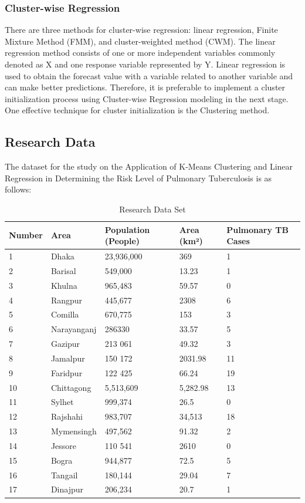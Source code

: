 \documentclass[conference]{IEEEtran}
\begin{document}
\subsubsection{Cluster-wise Regression}
There are three methods for cluster-wise regression: linear regression, Finite Mixture Method (FMM), and cluster-weighted method (CWM). The linear regression method consists of one or more independent variables commonly denoted as X and one response variable represented by Y. Linear regression is used to obtain the forecast value with a variable related to another variable and can make better predictions. Therefore, it is preferable to implement a cluster initialization process using Cluster-wise Regression modeling in the next stage. One effective technique for cluster initialization is the Clustering method.


\subsection{Research Data}
The dataset for the study on the Application of K-Means Clustering and Linear Regression in Determining the Risk Level of Pulmonary Tuberculosis is as follows:

\begin{table}[H]
    \centering
    \begin{tabularx}{\linewidth}{|X|X|X|X|X|}
    \hline
    \textbf{Number} & \textbf{Area} & \textbf{Population (People)} & \textbf{Area (km²)} & \textbf{Pulmonary} \textbf{TB Cases} \\
    \hline
    1 & Dhaka & 23,936,000 & 369 & 1 \\ \hline
    2 & Barisal & 549,000 & 13.23 & 1 \\ \hline
    3 & Khulna & 965,483 & 59.57 & 0 \\ \hline
    4 & Rangpur & 445,677 & 2308 & 6 \\ \hline
    5 & Comilla & 670,775 & 153 & 3 \\ \hline
    6 & Narayanganj & 286330 & 33.57 & 5 \\ \hline
    7 & Gazipur & 213 061 & 49.32 & 3 \\ \hline
    8 & Jamalpur & 150 172 & 2031.98 & 11 \\ \hline
    9 & Faridpur & 122 425 & 66.24 & 19 \\ \hline
    10 & Chittagong & 5,513,609 & 5,282.98 & 13 \\ \hline
    11 & Sylhet & 999,374 & 26.5 & 0 \\ \hline
    12 & Rajshahi & 983,707 & 34,513 & 18 \\ \hline
    13 & Mymensingh & 497,562 & 91.32 & 2 \\ \hline
    14 & Jessore & 110 541 & 2610 & 0 \\ \hline
    15 & Bogra & 944,877 & 72.5 & 5 \\ \hline
    16 & Tangail & 180,144 & 29.04 & 7 \\ \hline
    17 & Dinajpur & 206,234 & 20.7 & 1 \\
    \hline
    \end{tabularx}
    \caption{Research Data Set}
    \label{tab:research_data_set}
    \end{table}
\end{document}
